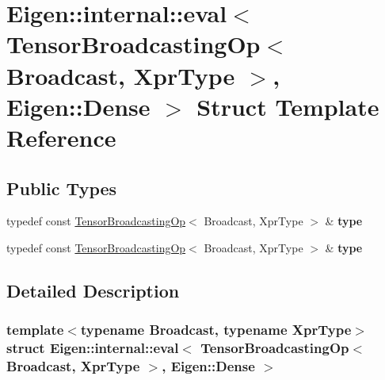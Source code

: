 \hypertarget{struct_eigen_1_1internal_1_1eval_3_01_tensor_broadcasting_op_3_01_broadcast_00_01_xpr_type_01_4_00_01_eigen_1_1_dense_01_4}{}\section{Eigen\+:\+:internal\+:\+:eval$<$ Tensor\+Broadcasting\+Op$<$ Broadcast, Xpr\+Type $>$, Eigen\+:\+:Dense $>$ Struct Template Reference}
\label{struct_eigen_1_1internal_1_1eval_3_01_tensor_broadcasting_op_3_01_broadcast_00_01_xpr_type_01_4_00_01_eigen_1_1_dense_01_4}
\subsection*{Public Types}
\begin{DoxyCompactItemize}
\item 
\mbox{\label{struct_eigen_1_1internal_1_1eval_3_01_tensor_broadcasting_op_3_01_broadcast_00_01_xpr_type_01_4_00_01_eigen_1_1_dense_01_4_a19bac4b853f52f4ed59c7d12bbde0d92}} 
typedef const \hyperlink{class_eigen_1_1_tensor_broadcasting_op}{Tensor\+Broadcasting\+Op}$<$ Broadcast, Xpr\+Type $>$ \& {\bfseries type}
\item 
\mbox{\label{struct_eigen_1_1internal_1_1eval_3_01_tensor_broadcasting_op_3_01_broadcast_00_01_xpr_type_01_4_00_01_eigen_1_1_dense_01_4_a19bac4b853f52f4ed59c7d12bbde0d92}} 
typedef const \hyperlink{class_eigen_1_1_tensor_broadcasting_op}{Tensor\+Broadcasting\+Op}$<$ Broadcast, Xpr\+Type $>$ \& {\bfseries type}
\end{DoxyCompactItemize}


\subsection{Detailed Description}
\subsubsection*{template$<$typename Broadcast, typename Xpr\+Type$>$\newline
struct Eigen\+::internal\+::eval$<$ Tensor\+Broadcasting\+Op$<$ Broadcast, Xpr\+Type $>$, Eigen\+::\+Dense $>$}



